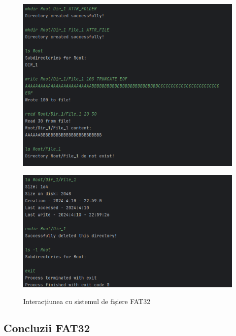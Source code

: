 \begin{figure}[h]
    \centering
    \includegraphics[width=1.0\linewidth]{images/2.5.1.png}
    \label{fig:enter-label}
\end{figure}

\clearpage
\begin{figure}[t!]

    \includegraphics[width=1.0\linewidth]{images/2.5.2.png}
    \label{fig:enter-label}
    \caption{Interacțiunea cu sistemul de fișiere FAT32}
\end{figure}

\bigskip


\subsection{Concluzii FAT32}

